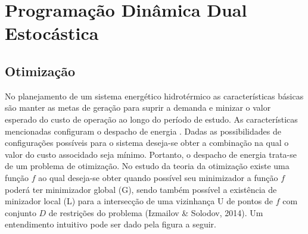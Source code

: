 \documentclass[12pt,fleqn]{article}
\begin{document}
\section{Programa\c c\~ao Din\^amica Dual Estoc\'astica}
\subsection{Otimiza\c c\~ao}
No planejamento de um sistema energ\'etico hidrot\'ermico as caracter\'isticas b\'asicas s\~ao manter as metas de gera\c c\~ao para suprir a demanda e minizar o valor esperado do custo de
opera\c c\~ao ao longo do per\'iodo de estudo. As caracter\'isticas mencionadas configuram o despacho de energia
. Dadas as possibilidades de configura\c c\~oes poss\'iveis para o sistema deseja-se obter a combina\c
c\~ao na qual o valor do custo
associdado seja m\'inimo. Portanto, o despacho de energia trata-se de um problema de otimiza\c c\~ao. No estudo da
teoria da otimiza\c c\~ao existe uma fun\c c\~ao $f$ ao qual deseja-se obter
quando poss\'ivel seu minimizador a fun\c c\~ao $f$ poder\'a ter minimizador
global (G), sendo tamb\'em poss\'ivel a exist\^encia de minizador local (L) para a intersec\c c\~ao  de uma vizinhan\c ca U
de pontos de $f$ com conjunto $D$ de restri\c c\~oes do problema (Izmailov \& Solodov, 2014). Um entendimento intuitivo
pode ser dado pela figura a seguir.
\end{document}
